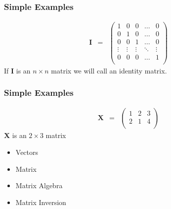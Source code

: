 \documentclass{beamer}
\numberwithin{equation}{section}
\begin{document}
\begin{frame}
\frametitle{Simple Examples} 

\begin{eqnarray} 
\boldsymbol{I} & = & \begin{pmatrix} 
1 & 0 & 0 & \hdots & 0 \\
0 & 1 & 0 & \hdots & 0 \\
0 & 0 & 1 & \hdots & 0 \\
\vdots & \vdots & \vdots & \ddots & \vdots \\
0 & 0 & 0 & \hdots & 1 \\
\end{pmatrix} 
\nonumber 
\end{eqnarray}
If $\boldsymbol{I}$ is an $n \times n$ matrix we will call an identity matrix.  

\end{frame}



\begin{frame}
\frametitle{Simple Examples} 

\begin{eqnarray}
\boldsymbol{X} & = & \begin{pmatrix} 
1 & 2 & 3 \\
2 & 1 & 4 \\
\end{pmatrix} 
\nonumber 
\end{eqnarray}
$\boldsymbol{X}$ is an $2 \times 3$ matrix

\end{frame}



\begin{frame}

\begin{itemize}
\item \textcolor{mygray}{Vectors}
\item \textcolor{mygray}{Matrix}
\item \textcolor{myblack}{Matrix Algebra}
\item \textcolor{mygray}{Matrix Inversion}
\end{itemize}

\end{frame}
\end{document}
